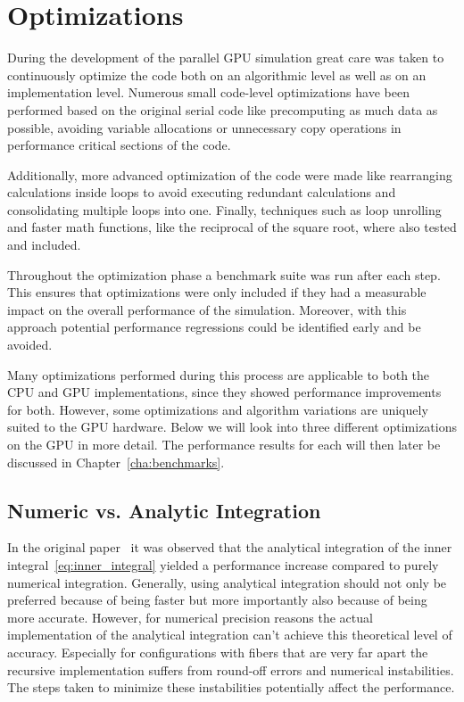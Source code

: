 \section{Optimizations}
\label{sec:parallel_optimizations}

During the development of the parallel GPU simulation great care was taken to continuously optimize the code both on an algorithmic level as well as on an implementation level. Numerous small code-level optimizations have been performed based on the original serial code like precomputing as much data as possible, avoiding variable allocations or unnecessary copy operations in performance critical sections of the code.

Additionally, more advanced optimization of the code were made like rearranging calculations inside loops to avoid executing redundant calculations and consolidating multiple loops into one. Finally, techniques such as loop unrolling and faster math functions, like the reciprocal of the square root, where also tested and included.

Throughout the optimization phase a benchmark suite was run after each step. This ensures that optimizations were only included if they had a measurable impact on the overall performance of the simulation. Moreover, with this approach potential performance regressions could be identified early and be avoided.

Many optimizations performed during this process are applicable to both the CPU and GPU implementations, since they showed performance improvements for both. However, some optimizations and algorithm variations are uniquely suited to the GPU hardware. Below we will look into three different optimizations on the GPU in more detail. The performance results for each will then later be discussed in Chapter~\ref{cha:benchmarks}.

\subsection{Numeric vs. Analytic Integration}
\label{subsec:numeric_analytic}
In the original paper~\cite{Tornberg2006} it was observed that the analytical integration of the inner integral~\eqref{eq:inner_integral} yielded a performance increase compared to purely numerical integration. Generally, using analytical integration should not only be preferred because of being faster but more importantly also because of being more accurate. However, for numerical precision reasons the actual implementation of the analytical integration can't achieve this theoretical level of accuracy. Especially for configurations with fibers that are very far apart the recursive implementation suffers from round-off errors and numerical instabilities. The steps taken to minimize these instabilities potentially affect the performance.

